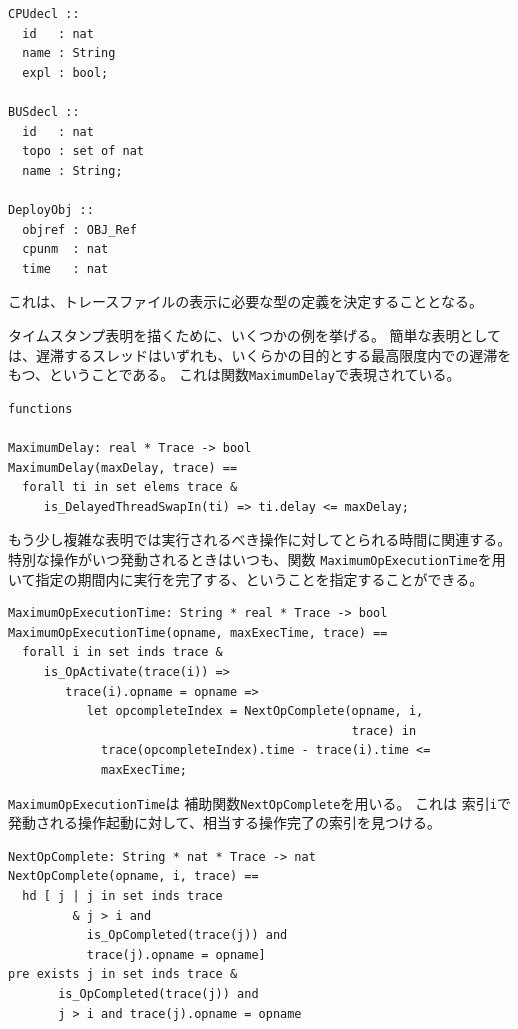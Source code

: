 \documentclass[\pformat,12pt]{jreport}
\begin{document}
\begin{lstlisting}
CPUdecl ::
  id   : nat
  name : String
  expl : bool;
  
BUSdecl ::
  id   : nat
  topo : set of nat
  name : String;

DeployObj ::
  objref : OBJ_Ref
  cpunm  : nat
  time   : nat
\end{lstlisting}
 
これは、トレースファイルの表示に必要な型の定義を決定することとなる。

タイムスタンプ表明を描くために、いくつかの例を挙げる。
簡単な表明としては、遅滞するスレッドはいずれも、いくらかの目的とする最高限度内での遅滞をもつ、ということである。
これは関数\texttt{MaximumDelay}で表現されている。

\begin{lstlisting}
functions

MaximumDelay: real * Trace -> bool
MaximumDelay(maxDelay, trace) ==
  forall ti in set elems trace &
     is_DelayedThreadSwapIn(ti) => ti.delay <= maxDelay;
\end{lstlisting}

もう少し複雑な表明では実行されるべき操作に対してとられる時間に関連する。
特別な操作がいつ発動されるときはいつも、関数 \texttt{MaximumOpExecutionTime}を用いて指定の期間内に実行を完了する、ということを指定することができる。

\begin{lstlisting}
MaximumOpExecutionTime: String * real * Trace -> bool
MaximumOpExecutionTime(opname, maxExecTime, trace) ==
  forall i in set inds trace &
     is_OpActivate(trace(i)) =>
        trace(i).opname = opname =>
           let opcompleteIndex = NextOpComplete(opname, i,
                                                trace) in
             trace(opcompleteIndex).time - trace(i).time <= 
             maxExecTime;
\end{lstlisting}

\texttt{MaximumOpExecutionTime}は 補助関数\texttt{NextOpComplete}を用いる。 
これは 索引\texttt{i}で発動される操作起動に対して、相当する操作完了の索引を見つける。

\begin{lstlisting}
NextOpComplete: String * nat * Trace -> nat
NextOpComplete(opname, i, trace) ==
  hd [ j | j in set inds trace
         & j > i and
           is_OpCompleted(trace(j)) and 
           trace(j).opname = opname]
pre exists j in set inds trace & 
       is_OpCompleted(trace(j)) and
       j > i and trace(j).opname = opname
\end{lstlisting}
\end{document}
